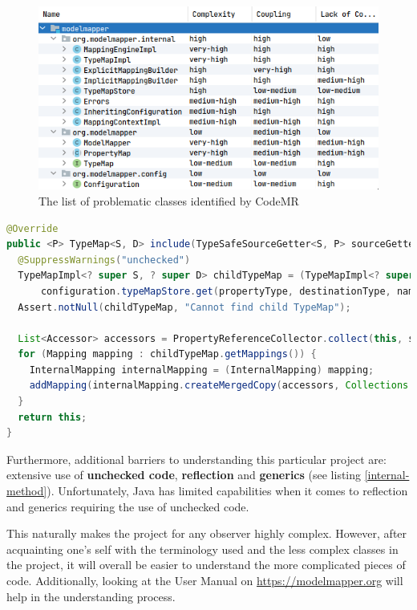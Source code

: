 \documentclass[12pt]{article}
\begin{document}
\begin{figure}[H]
    \centering
    \includegraphics[width=14cm]{images/problematic-classes.png}
    \caption{The list of problematic classes identified by CodeMR}
    \label{problematic-classes}
\end{figure}

\begin{lstlisting}[language=Java,label={internal-method},caption={An
internal method in the class \texttt{TypeMapImpl} which
was reported by CodeMR as having \texttt{very--high}
complexity}]
@Override
public <P> TypeMap<S, D> include(TypeSafeSourceGetter<S, P> sourceGetter, Class<P> propertyType) {
  @SuppressWarnings("unchecked")
  TypeMapImpl<? super S, ? super D> childTypeMap = (TypeMapImpl<? super S, ? super D>)
      configuration.typeMapStore.get(propertyType, destinationType, name);
  Assert.notNull(childTypeMap, "Cannot find child TypeMap");

  List<Accessor> accessors = PropertyReferenceCollector.collect(this, sourceGetter);
  for (Mapping mapping : childTypeMap.getMappings()) {
    InternalMapping internalMapping = (InternalMapping) mapping;
    addMapping(internalMapping.createMergedCopy(accessors, Collections.<PropertyInfo>emptyList()));
  }
  return this;
}
\end{lstlisting}

Furthermore, additional barriers to understanding this
particular project are: extensive use of \textbf{unchecked
code}, \textbf{reflection} and \textbf{generics} (see listing
\ref{internal-method}). Unfortunately, Java has limited
capabilities when it comes to reflection and generics requiring
the use of unchecked code.

This naturally makes the project for any observer highly
complex. However, after acquainting one's self with the
terminology used and the less complex classes in the project, it
will overall be easier to understand the more complicated pieces
of code. Additionally, looking at the User Manual on
\url{https://modelmapper.org} will help in the understanding process.
\end{document}
